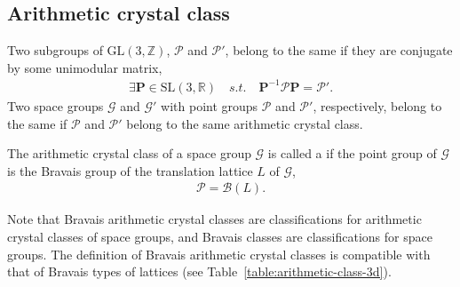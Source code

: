 
\subsection{\label{sec:arithmetic-crystal-class}Arithmetic crystal class}

\begin{screen}
  \begin{defn}
    Two subgroups of $\mathrm{GL}(3, \mathbb{Z})$, $\mathcal{P}$ and $\mathcal{P}'$, belong to the same  if they are conjugate by some unimodular matrix,
    \begin{align}
      \exists \bm{P} \in \mathrm{SL}(3, \mathbb{R}) \quad s.t. \quad \bm{P}^{-1} \mathcal{P} \bm{P} = \mathcal{P}'.
    \end{align}
    Two space groups $\mathcal{G}$ and $\mathcal{G}'$ with point groups $\mathcal{P}$ and $\mathcal{P}'$, respectively, belong to the same  if $\mathcal{P}$ and $\mathcal{P}'$ belong to the same arithmetic crystal class.
  \end{defn}
\end{screen}

\begin{screen}
  \begin{defn}
    The arithmetic crystal class of a space group $\mathcal{G}$ is called a  if the point group of $\mathcal{G}$ is the Bravais group of the translation lattice $L$ of $\mathcal{G}$,
    \begin{align}
      \mathcal{P} = \mathcal{B}(L).
    \end{align}
  \end{defn}
\end{screen}

Note that Bravais arithmetic crystal classes are classifications for arithmetic crystal classes of space groups, and Bravais classes are classifications for space groups.
The definition of Bravais arithmetic crystal classes is compatible with that of Bravais types of lattices (see Table~\ref{table:arithmetic-class-3d}).

